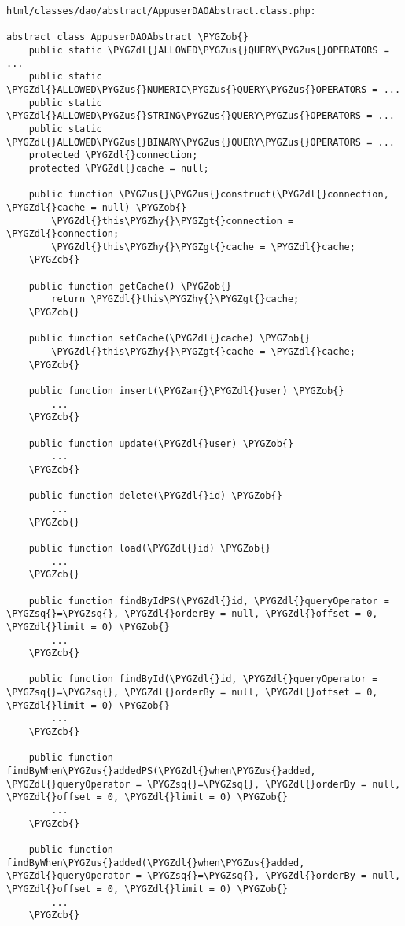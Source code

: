 \documentclass[letterpaper,10pt,english]{sphinxmanual}
\def\PYGZus{\char`\_}
\def\PYGZob{\char`\{}
\def\PYGZcb{\char`\}}
\def\PYGZam{\char`\&}
\def\PYGZgt{\char`\>}
\def\PYGZdl{\char`\$}
\def\PYGZhy{\char`\-}
\def\PYGZsq{\char`\'}
\renewcommand\PYGZsq{\textquotesingle}
\begin{document}
\begin{Verbatim}[commandchars=\\\{\}]
html/classes/dao/abstract/AppuserDAOAbstract.class.php:

abstract class AppuserDAOAbstract \PYGZob{}
    public static \PYGZdl{}ALLOWED\PYGZus{}QUERY\PYGZus{}OPERATORS = ...
    public static \PYGZdl{}ALLOWED\PYGZus{}NUMERIC\PYGZus{}QUERY\PYGZus{}OPERATORS = ...
    public static \PYGZdl{}ALLOWED\PYGZus{}STRING\PYGZus{}QUERY\PYGZus{}OPERATORS = ...
    public static \PYGZdl{}ALLOWED\PYGZus{}BINARY\PYGZus{}QUERY\PYGZus{}OPERATORS = ...
    protected \PYGZdl{}connection;
    protected \PYGZdl{}cache = null;

    public function \PYGZus{}\PYGZus{}construct(\PYGZdl{}connection, \PYGZdl{}cache = null) \PYGZob{}
        \PYGZdl{}this\PYGZhy{}\PYGZgt{}connection = \PYGZdl{}connection;
        \PYGZdl{}this\PYGZhy{}\PYGZgt{}cache = \PYGZdl{}cache;
    \PYGZcb{}

    public function getCache() \PYGZob{}
        return \PYGZdl{}this\PYGZhy{}\PYGZgt{}cache;
    \PYGZcb{}

    public function setCache(\PYGZdl{}cache) \PYGZob{}
        \PYGZdl{}this\PYGZhy{}\PYGZgt{}cache = \PYGZdl{}cache;
    \PYGZcb{}

    public function insert(\PYGZam{}\PYGZdl{}user) \PYGZob{}
        ...
    \PYGZcb{}

    public function update(\PYGZdl{}user) \PYGZob{}
        ...
    \PYGZcb{}

    public function delete(\PYGZdl{}id) \PYGZob{}
        ...
    \PYGZcb{}

    public function load(\PYGZdl{}id) \PYGZob{}
        ...
    \PYGZcb{}

    public function findByIdPS(\PYGZdl{}id, \PYGZdl{}queryOperator = \PYGZsq{}=\PYGZsq{}, \PYGZdl{}orderBy = null, \PYGZdl{}offset = 0, \PYGZdl{}limit = 0) \PYGZob{}
        ...
    \PYGZcb{}

    public function findById(\PYGZdl{}id, \PYGZdl{}queryOperator = \PYGZsq{}=\PYGZsq{}, \PYGZdl{}orderBy = null, \PYGZdl{}offset = 0, \PYGZdl{}limit = 0) \PYGZob{}
        ...
    \PYGZcb{}

    public function findByWhen\PYGZus{}addedPS(\PYGZdl{}when\PYGZus{}added, \PYGZdl{}queryOperator = \PYGZsq{}=\PYGZsq{}, \PYGZdl{}orderBy = null, \PYGZdl{}offset = 0, \PYGZdl{}limit = 0) \PYGZob{}
        ...
    \PYGZcb{}

    public function findByWhen\PYGZus{}added(\PYGZdl{}when\PYGZus{}added, \PYGZdl{}queryOperator = \PYGZsq{}=\PYGZsq{}, \PYGZdl{}orderBy = null, \PYGZdl{}offset = 0, \PYGZdl{}limit = 0) \PYGZob{}
        ...
    \PYGZcb{}


\end{Verbatim}
\end{document}
